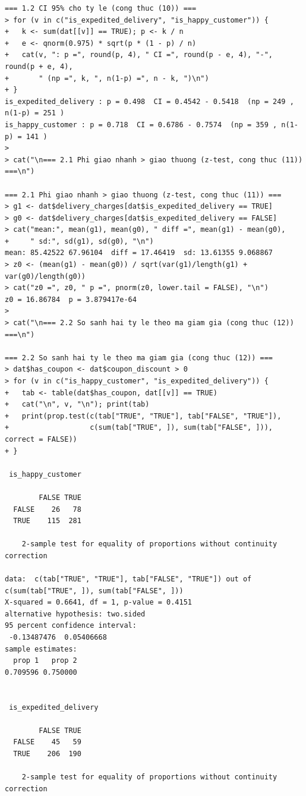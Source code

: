 \documentclass[12pt, a4paper]{article}
\begin{document}
\begin{lstlisting}
=== 1.2 CI 95% cho ty le (cong thuc (10)) ===
> for (v in c("is_expedited_delivery", "is_happy_customer")) {
+   k <- sum(dat[[v]] == TRUE); p <- k / n
+   e <- qnorm(0.975) * sqrt(p * (1 - p) / n)
+   cat(v, ": p =", round(p, 4), " CI =", round(p - e, 4), "-", round(p + e, 4),
+       " (np =", k, ", n(1-p) =", n - k, ")\n")
+ }
is_expedited_delivery : p = 0.498  CI = 0.4542 - 0.5418  (np = 249 , n(1-p) = 251 )
is_happy_customer : p = 0.718  CI = 0.6786 - 0.7574  (np = 359 , n(1-p) = 141 )
> 
> cat("\n=== 2.1 Phi giao nhanh > giao thuong (z-test, cong thuc (11)) ===\n")

=== 2.1 Phi giao nhanh > giao thuong (z-test, cong thuc (11)) ===
> g1 <- dat$delivery_charges[dat$is_expedited_delivery == TRUE]
> g0 <- dat$delivery_charges[dat$is_expedited_delivery == FALSE]
> cat("mean:", mean(g1), mean(g0), " diff =", mean(g1) - mean(g0),
+     " sd:", sd(g1), sd(g0), "\n")
mean: 85.42522 67.96104  diff = 17.46419  sd: 13.61355 9.068867 
> z0 <- (mean(g1) - mean(g0)) / sqrt(var(g1)/length(g1) + var(g0)/length(g0))
> cat("z0 =", z0, " p =", pnorm(z0, lower.tail = FALSE), "\n")
z0 = 16.86784  p = 3.879417e-64 
> 
> cat("\n=== 2.2 So sanh hai ty le theo ma giam gia (cong thuc (12)) ===\n")

=== 2.2 So sanh hai ty le theo ma giam gia (cong thuc (12)) ===
> dat$has_coupon <- dat$coupon_discount > 0
> for (v in c("is_happy_customer", "is_expedited_delivery")) {
+   tab <- table(dat$has_coupon, dat[[v]] == TRUE)
+   cat("\n", v, "\n"); print(tab)
+   print(prop.test(c(tab["TRUE", "TRUE"], tab["FALSE", "TRUE"]),
+                   c(sum(tab["TRUE", ]), sum(tab["FALSE", ])), correct = FALSE))
+ }

 is_happy_customer 
       
        FALSE TRUE
  FALSE    26   78
  TRUE    115  281

	2-sample test for equality of proportions without continuity correction

data:  c(tab["TRUE", "TRUE"], tab["FALSE", "TRUE"]) out of c(sum(tab["TRUE", ]), sum(tab["FALSE", ]))
X-squared = 0.6641, df = 1, p-value = 0.4151
alternative hypothesis: two.sided
95 percent confidence interval:
 -0.13487476  0.05406668
sample estimates:
  prop 1   prop 2 
0.709596 0.750000 


 is_expedited_delivery 
       
        FALSE TRUE
  FALSE    45   59
  TRUE    206  190

	2-sample test for equality of proportions without continuity correction


\end{lstlisting}
\end{document}
